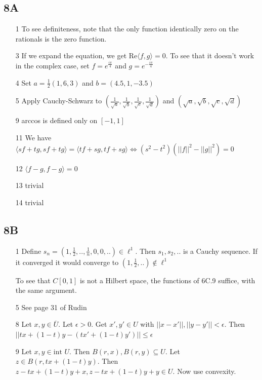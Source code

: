 \documentclass{article}
\begin{document}
\subsection*{8A}
\begin{itemize}
    \item[1] To see definiteness, note that the only function identically zero on the rationals is the zero function. 
    \item [3] If we expand the equation, we get Re$\langle f,g\rangle=0$. To see that it doesn't work in the complex case, set $f=e^{\frac{i\pi}{4}}$ and $g=e^{-\frac{i\pi}{4}}$
    \item[4] Set $a=\frac{1}{2}(1,6,3)$ and $b=(4.5,1,-3.5)$
    \item[5] Apply Cauchy-Schwarz to $(\frac{1}{\sqrt{a}},\frac{1}{\sqrt{b}},\frac{1}{\sqrt{c}},\frac{1}{\sqrt{d}})$ and $(\sqrt{a},\sqrt{b},\sqrt{c},\sqrt{d})$
    \item[9] arccos is defined only on $[-1,1]$ 
    \item[11] We have $\langle sf+tg,sf+tg\rangle=\langle tf+sg,tf+sg\rangle \iff (s^2-t^2)(||f||^2-||g||^2)=0$
    \item[12] $\langle f-g,f-g\rangle=0$ 
    \item[13] trivial
    \item[14] trivial 
\end{itemize}

\subsection*{8B}
\begin{itemize}
    \item [1] Define $s_n=(1,\frac{1}{2},..,\frac{1}{n},0,0,..)\in \ell^1$. Then $s_1,s_2,..$ is a Cauchy sequence. If it converged it would converge to $(1,\frac{1}{2},..)\notin \ell^1$

    To see that $C[0,1]$ is not a Hilbert space, the functions of 6C.9 suffice, with the same argument.
    \item[5] See page 31 of Rudin
    \item[8] Let $x,y \in \overline{U}$. Let $\epsilon>0$. Get $x',y' \in U$ with $||x-x'||,||y-y'||<\epsilon$. Then $||tx+(1-t)y-(tx'+(1-t)y')||\leq \epsilon$
    \item[9] Let $x,y \in \text{int } U$. Then $B(r,x),B(r,y)\subseteq U$. Let $z \in B(r,tx+(1-t)y)$. Then $z-tx+(1-t)y+x ,z-tx+(1-t)y+y\in U$. Now use convexity.
\end{itemize}
\end{document}
